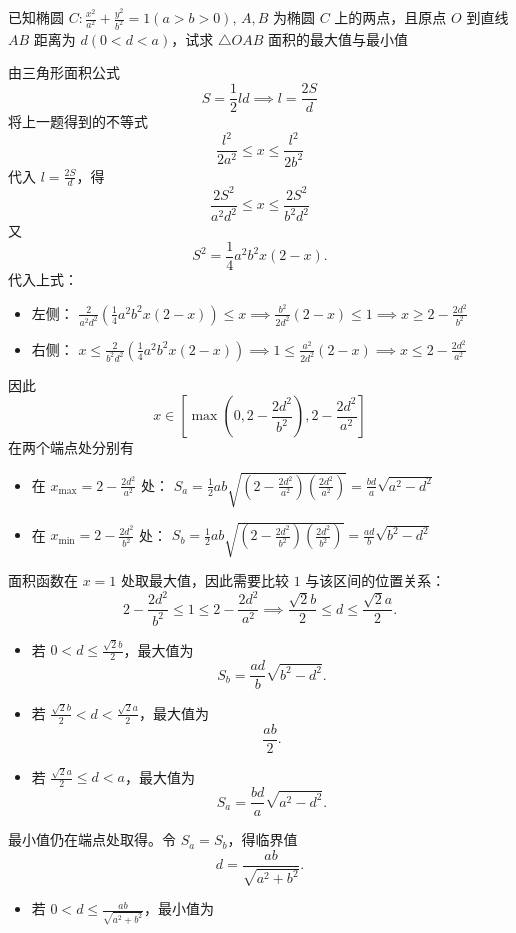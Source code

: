 \begin{exercise}[定距离面积问题]
 已知椭圆 $C: \frac{x^2}{a^2} + \frac{y^2}{b^2} = 1 (a > b > 0)$, $A, B$ 为椭圆 $C$ 上的两点，且原点 $O$ 到直线 $AB$ 距离为 $d (0 < d < a)$，试求 $\triangle OAB$ 面积的最大值与最小值
\end{exercise}
\begin{solution}
由三角形面积公式
$$S = \frac{1}{2}ld \implies l = \frac{2S}{d}$$
将上一题得到的不等式
$$\frac{l^2}{2a^2} \leq x \leq \frac{l^2}{2b^2}$$
代入 $l=\frac{2S}{d}$，得
$$\frac{2S^2}{a^2d^2} \leq x \leq \frac{2S^2}{b^2d^2}$$
又
$$S^2 = \frac{1}{4}a^2b^2x(2-x).$$
代入上式：
\begin{itemize}
\item 左侧： $\frac{2}{a^2d^2}\left(\frac{1}{4}a^2b^2x(2-x)\right) \leq x \implies \frac{b^2}{2d^2}(2-x) \leq 1 \implies x \geq 2 - \frac{2d^2}{b^2}$
\item 右侧： $x \leq \frac{2}{b^2d^2}\left(\frac{1}{4}a^2b^2x(2-x)\right) \implies 1 \leq \frac{a^2}{2d^2}(2-x) \implies x \leq 2 - \frac{2d^2}{a^2}$
\end{itemize}
因此
$$x \in \left[\max\left(0, 2 - \frac{2d^2}{b^2}\right), 2 - \frac{2d^2}{a^2}\right]$$
在两个端点处分别有
\begin{itemize}
\item 在 $x_{\max} = 2 - \frac{2d^2}{a^2}$ 处： $S_a = \frac{1}{2}ab\sqrt{\left(2 - \frac{2d^2}{a^2}\right)\left(\frac{2d^2}{a^2}\right)} = \frac{bd}{a}\sqrt{a^2 - d^2}$
\item 在 $x_{\min} = 2 - \frac{2d^2}{b^2}$ 处： $S_b = \frac{1}{2}ab\sqrt{\left(2 - \frac{2d^2}{b^2}\right)\left(\frac{2d^2}{b^2}\right)} = \frac{ad}{b}\sqrt{b^2 - d^2}$
\end{itemize}
面积函数在 $x=1$ 处取最大值，因此需要比较 $1$ 与该区间的位置关系：
$$2 - \frac{2d^2}{b^2} \leq 1 \leq 2 - \frac{2d^2}{a^2} \implies \frac{\sqrt{2}b}{2} \leq d \leq \frac{\sqrt{2}a}{2}.$$
\begin{itemize}
\item 若 $0 < d \leq \frac{\sqrt{2}b}{2}$，最大值为
$$S_b = \frac{ad}{b}\sqrt{b^2 - d^2}.$$
\item 若 $\frac{\sqrt{2}b}{2} < d < \frac{\sqrt{2}a}{2}$，最大值为
$$\frac{ab}{2}.$$
\item 若 $\frac{\sqrt{2}a}{2} \leq d < a$，最大值为
$$S_a = \frac{bd}{a}\sqrt{a^2 - d^2}.$$
\end{itemize}
最小值仍在端点处取得。令 $S_a = S_b$，得临界值
$$d = \frac{ab}{\sqrt{a^2+b^2}}.$$
\begin{itemize}
\item 若 $0 < d \leq \frac{ab}{\sqrt{a^2+b^2}}$，最小值为

\end{itemize}
\end{solution}
